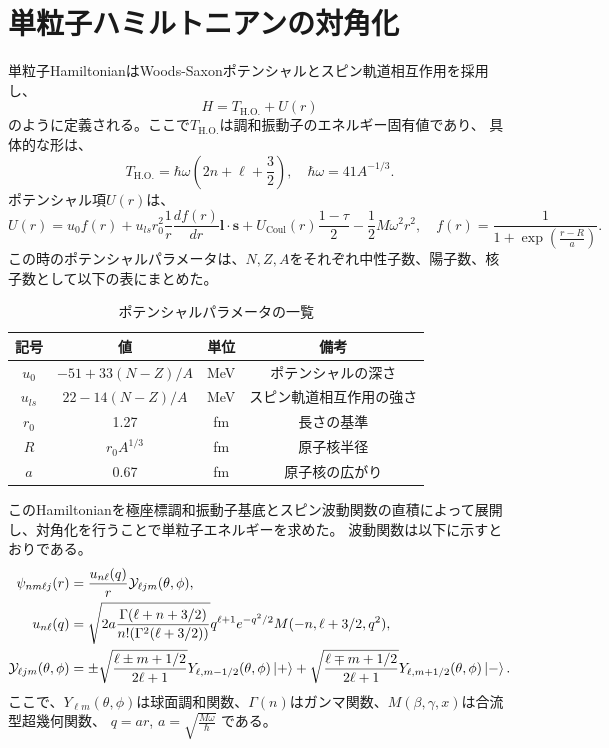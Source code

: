 \documentclass[a4paper]{jsreport}
\begin{document}
  \section{単粒子ハミルトニアンの対角化}
  単粒子HamiltonianはWoods-Saxonポテンシャルとスピン軌道相互作用を採用し、
  \begin{equation}
    H=T_{\text{H.O.}}+U(r)
  \end{equation}
  のように定義される。ここで\(T_{\text{H.O.}}\)は調和振動子のエネルギー固有値であり、
  具体的な形は、
  \begin{equation}
    T_{\text{H.O.}} = \hbar\omega\left(2n+\ell+\frac{3}{2}\right),\quad \hbar\omega=41A^{-1/3}.
  \end{equation}
  ポテンシャル項\(U(r)\)は、
  \begin{equation}
    U(r) = u_0 f(r) + u_{ls} r_0^2 \frac{1}{r} \frac{df(r)}{dr} \boldsymbol{l} \cdot \boldsymbol{s}
      + U_{\text{Coul}}(r) \frac{1 - \tau}{2}-\frac{1}{2}M\omega^2r^2, \quad f(r)=\frac{1}{1 + \exp \left( \frac{r - R}{a} \right)}.
  \end{equation}
  この時のポテンシャルパラメータは、\(N,Z,A\)をそれぞれ中性子数、陽子数、核子数として以下の表にまとめた。\par
  \begin{table}[htbp]
    \centering
    \caption{ポテンシャルパラメータの一覧}
    \begin{tabular}{c c c c}
        \hline
        記号 & 値 & 単位 & 備考 \\
        \hline
        \( u_0 \) & \(-51+33(N-Z)/A\) & MeV & ポテンシャルの深さ \\
        \( u_{ls} \) & \(22-14(N-Z)/A\) & MeV & スピン軌道相互作用の強さ \\
        \(r_0\)    & 1.27              &  fm & 長さの基準\\
        \( R \) & \(r_0 A^{1/3}\) & fm & 原子核半径 \\
        \( a \) & 0.67 & fm & 原子核の広がり \\
        \hline
    \end{tabular}
  \end{table}

  このHamiltonianを極座標調和振動子基底とスピン波動関数の直積によって展開し、対角化を行うことで単粒子エネルギーを求めた。
  波動関数は以下に示すとおりである。
  \begin{align}
    \psi_{nm\ell j}(r)  &=\frac{u_{n\ell}(q)}{r}\mathcal{Y}_{\ell j m}(\theta,\phi),\\
    u_{n\ell}(q)        &=\sqrt{2a\dfrac{\Gamma(\ell+n+3/2)}{n!(\Gamma^2(\ell+3/2))}}q^{\ell+1}e^{-q^2/2}M(-n,\ell+3/2,q^2),\\
    \mathcal{Y}_{\ell j m}(\theta,\phi)
    &=\pm\sqrt{\frac{\ell \pm m + 1/2}{2\ell+1}}Y_{\ell, m-1/2}(\theta,\phi)\ket{+}
    +\sqrt{\frac{\ell \mp m + 1/2}{2\ell+1}}Y_{\ell, m+1/2}(\theta,\phi)\ket{-}.
  \end{align}
  ここで、\(Y_{\ell m}(\theta,\phi)\)は球面調和関数、\(\Gamma(n)\)はガンマ関数、\(M(\beta,\gamma,x)\)は合流型超幾何関数、
  \(q=ar\), \(a=\sqrt{\frac{M\omega}{\hbar}}\) である。
\end{document}
